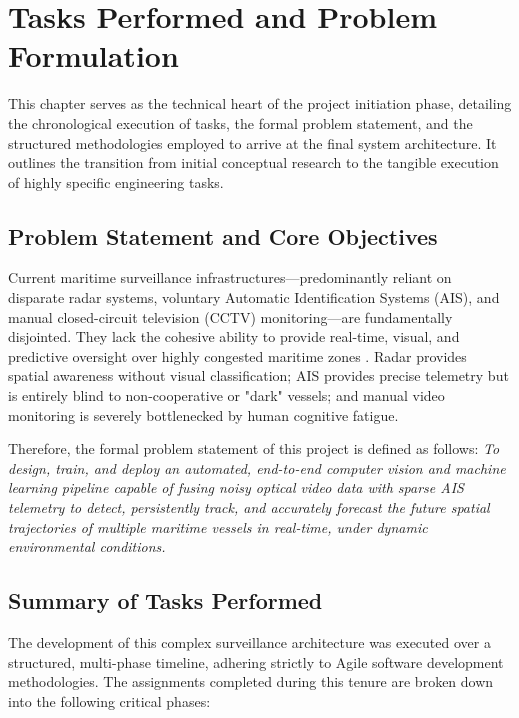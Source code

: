 \chapter{Tasks Performed and Problem Formulation}

This chapter serves as the technical heart of the project initiation phase, detailing the chronological execution of tasks, the formal problem statement, and the structured methodologies employed to arrive at the final system architecture. It outlines the transition from initial conceptual research to the tangible execution of highly specific engineering tasks.

\section{Problem Statement and Core Objectives}
Current maritime surveillance infrastructures—predominantly reliant on disparate radar systems, voluntary Automatic Identification Systems (AIS), and manual closed-circuit television (CCTV) monitoring—are fundamentally disjointed. They lack the cohesive ability to provide real-time, visual, and predictive oversight over highly congested maritime zones \citep{Ref01}. Radar provides spatial awareness without visual classification; AIS provides precise telemetry but is entirely blind to non-cooperative or "dark" vessels; and manual video monitoring is severely bottlenecked by human cognitive fatigue. 

Therefore, the formal problem statement of this project is defined as follows: \textit{To design, train, and deploy an automated, end-to-end computer vision and machine learning pipeline capable of fusing noisy optical video data with sparse AIS telemetry to detect, persistently track, and accurately forecast the future spatial trajectories of multiple maritime vessels in real-time, under dynamic environmental conditions.}

\section{Summary of Tasks Performed}
The development of this complex surveillance architecture was executed over a structured, multi-phase timeline, adhering strictly to Agile software development methodologies. The assignments completed during this tenure are broken down into the following critical phases:

